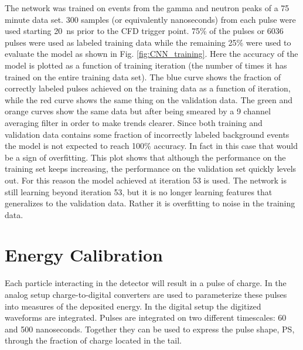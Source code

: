 \documentclass[main.tex]{subfiles}
\begin{document}
The network was trained on events from the gamma and neutron peaks of a 75 minute data set. 300 samples (or equivalently nanoseconds) from each pulse were used starting \SI{20}{ns} prior to the CFD trigger point. 75\% of the pulses or 6036 pulses were used as labeled training data while the remaining 25\% were used to evaluate the model as shown in Fig. \ref{fig:CNN_training}. Here the accuracy of the model is plotted as a function of training iteration (the number of times it has trained on the entire training data set). The blue curve shows the fraction of correctly labeled pulses achieved on the training data as a function of iteration, while the red curve shows the same thing on the validation data. The green and orange curves show the same data but after being smeared by a 9 channel averaging filter in order to make trends clearer. Since both training and validation data contains some fraction of incorrectly labeled background events the model is not expected to reach 100\% accuracy. In fact in this case that would be a sign of overfitting. This plot shows that although the performance on the training set keeps increasing, the performance on the validation set quickly levels out. For this reason the model achieved at iteration 53 is used. The network is still learning beyond iteration 53, but it is no longer learning features that generalizes to the validation data. Rather it is overfitting to noise in the training data.


\section{Energy Calibration}
Each particle interacting in the detector will result in a pulse of charge. In the analog setup charge-to-digital converters are used to parameterize these pulses into measures of the deposited energy. In the digital setup the digitized waveforms are integrated. Pulses are integrated on two different timescales: 60 and 500 nanoseconds. Together they can be used to express the pulse shape, PS, through the fraction of charge located in the tail.
\end{document}

